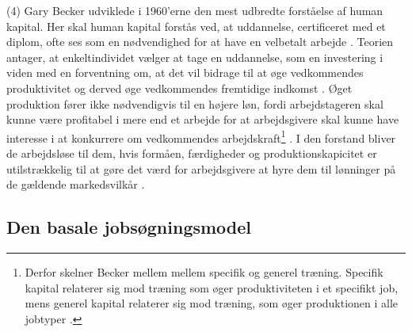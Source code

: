 (4) Gary Becker udviklede i 1960'erne den mest udbredte forståelse af human kapital. Her skal human kapital forstås ved, at uddannelse, certificeret med et diplom, ofte ses som en nødvendighed for at have en velbetalt arbejde \parencite[60]{Cahuc2004}. Teorien antager, at enkeltindividet vælger at tage en uddannelse, som en investering i viden med en forventning om, at det vil bidrage til at øge vedkommendes produktivitet og derved øge vedkommendes fremtidige indkomst \parencite[69]{Cahuc2004}. Øget produktion fører ikke nødvendigvis til en højere løn, fordi arbejdstageren skal kunne være profitabel i mere end et arbejde for at arbejdsgivere skal kunne have interesse i at konkurrere om vedkommendes arbejdskraft\footnote{Derfor skelner Becker mellem mellem specifik og generel træning. Specifik kapital relaterer sig mod træning som øger produktiviteten i et specifikt job, mens generel kapital relaterer sig mod træning, som øger produktionen i alle jobtyper \parencite[70]{Cahuc2004}.} \parencite[70]{Cahuc2004}. I den forstand bliver de arbejdsløse til dem, hvis formåen, færdigheder og produktionskapicitet er utilstrækkelig til at gøre det værd for arbejdsgivere at hyre dem til lønninger på de gældende markedsvilkår \parencite[70]{Doeringer1971}. %


\subsection{Den basale jobsøgningsmodel}

